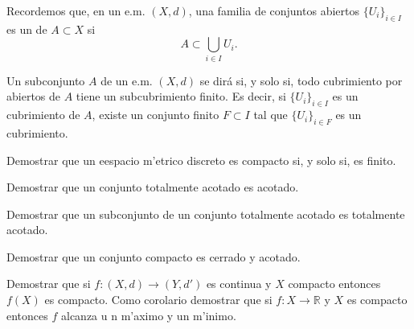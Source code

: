 Recordemos que, en un e.m. $(X,d)$, una familia de conjuntos
abiertos $\{U_i\}_{i\in I}$ es un  de $A\subset X$ si
\[
    A\subset\bigcup\limits_{i\in I}U_i.
\]
\begin{definicion} Un subconjunto $A$ de un e.m. $(X,d)$ se dir\'a
 si, y solo si, todo cubrimiento por abiertos de
$A$ tiene un subcubrimiento finito. Es decir, si $\{U_i\}_{i\in
I}$ es un cubrimiento  de $A$, existe un conjunto finito $F\subset
I$ tal que $\{U_i\}_{i\in F}$ es un cubrimiento.
\end{definicion}



\begin{ejercicio} Demostrar que un eespacio m'etrico discreto es compacto
si, y solo si, es finito.
\end{ejercicio}

\begin{ejercicio} Demostrar que un conjunto totalmente acotado es
acotado.
\end{ejercicio}

\begin{ejercicio}\label{ejer,subpreespre} Demostrar que un
subconjunto de un conjunto totalmente acotado es totalmente
acotado.
\end{ejercicio}

\begin{ejercicio} Demostrar que un conjunto compacto es cerrado y
acotado.
\end{ejercicio}

\begin{ejercicio} Demostrar que si $f:(X,d)\to (Y,d')$ es continua
y $X$ compacto entonces $f(X)$ es compacto. Como corolario
demostrar que si $f:X\to\mathbb{R}$ y $X$ es compacto entonces $f$
alcanza u n m'aximo y un m'inimo.
\end{ejercicio}

